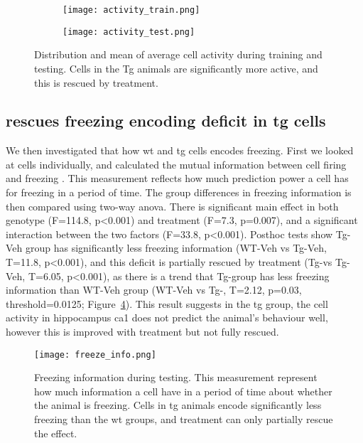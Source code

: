 \begin{figure}[h]
    \begin{subfigure}[h]{\textwidth}
        \texttt{[image: activity\_train.png]}
        \caption{\label{f.ad.acttrain}}
    \end{subfigure}
    \begin{subfigure}[h]{\textwidth}
        \texttt{[image: activity\_test.png]}
        \caption{\label{f.ad.acttest}}
    \end{subfigure}
    \caption{Distribution and mean of average cell activity during  training and  testing. Cells in the Tg animals are significantly more active, and this is rescued by \tglu treatment. \label{f.ad.activity}}
\end{figure}

\subsection{\tglu rescues freezing encoding deficit in \gls{tg} cells}

We then investigated that how \gls{wt} and \gls{tg} cells encodes freezing. First we looked at cells individually, and calculated the mutual information between cell firing and freezing \citep{skaggs93}. This measurement reflects how much prediction power a cell has for freezing in a period of time. The group differences in freezing information is then compared using two-way \gls{anova}. There is significant main effect in both genotype (F=114.8, p<0.001) and treatment (F=7.3, p=0.007), and a significant interaction between the two factors (F=33.8, p<0.001). Posthoc tests show Tg-Veh group has significantly less freezing information (WT-Veh vs Tg-Veh, T=11.8, p<0.001), and this deficit is partially rescued by \tglu treatment (Tg-\tglu vs Tg-Veh, T=6.05, p<0.001), as there is a trend that Tg-\tglu group has less freezing information than WT-Veh group (WT-Veh vs Tg-\tglu, T=2.12, p=0.03, threshold=0.0125; Figure~\ref{f.ad.freeze_info}). This result suggests in the \gls{tg} group, the cell activity in hippocampus \gls{ca1} does not predict the animal's behaviour well, however this is improved with \tglu treatment but not fully rescued. 
\begin{figure}[h]
    \texttt{[image: freeze\_info.png]}
    \caption{Freezing information during testing. This measurement represent how much information a cell have in a period of time about whether the animal is freezing. Cells in \gls{tg} animals encode significantly less freezing than the \gls{wt} groups, and \tglu treatment can only partially rescue the effect. \label{f.ad.freeze_info}}
\end{figure}
    

